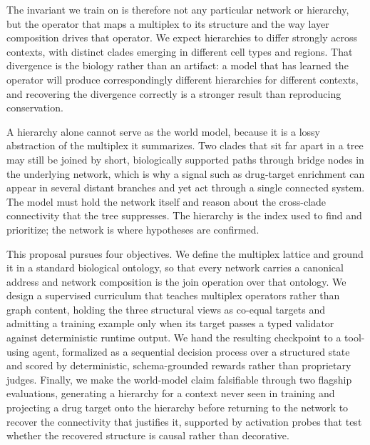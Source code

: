 \documentclass[thesis,letterpaper,12pt]{utthesis}
\begin{document}
The invariant we train on is therefore not any particular network or hierarchy, but the operator that maps a multiplex to its structure and the way layer composition drives that operator. We expect hierarchies to differ strongly across contexts, with distinct clades emerging in different cell types and regions. That divergence is the biology rather than an artifact: a model that has learned the operator will produce correspondingly different hierarchies for different contexts, and recovering the divergence correctly is a stronger result than reproducing conservation.

A hierarchy alone cannot serve as the world model, because it is a lossy abstraction of the multiplex it summarizes. Two clades that sit far apart in a tree may still be joined by short, biologically supported paths through bridge nodes in the underlying network, which is why a signal such as drug-target enrichment can appear in several distant branches and yet act through a single connected system. The model must hold the network itself and reason about the cross-clade connectivity that the tree suppresses. The hierarchy is the index used to find and prioritize; the network is where hypotheses are confirmed.

This proposal pursues four objectives. We define the multiplex lattice and ground it in a standard biological ontology, so that every network carries a canonical address and network composition is the join operation over that ontology. We design a supervised curriculum that teaches multiplex operators rather than graph content, holding the three structural views as co-equal targets and admitting a training example only when its target passes a typed validator against deterministic runtime output. We hand the resulting checkpoint to a tool-using agent, formalized as a sequential decision process over a structured state and scored by deterministic, schema-grounded rewards rather than proprietary judges. Finally, we make the world-model claim falsifiable through two flagship evaluations, generating a hierarchy for a context never seen in training and projecting a drug target onto the hierarchy before returning to the network to recover the connectivity that justifies it, supported by activation probes that test whether the recovered structure is causal rather than decorative.
\end{document}
